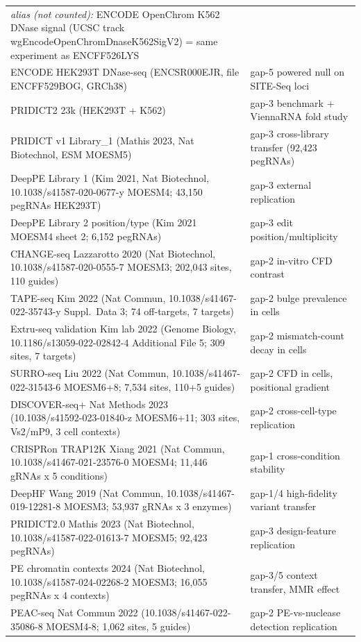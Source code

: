 \begin{longtable}{@{}p{}p{}@{}}
\quad \emph{alias (not counted):} ENCODE OpenChrom K562 DNase signal (UCSC track wgEncodeOpenChromDnaseK562SigV2) = same experiment as ENCFF526LYS \\
ENCODE HEK293T DNase-seq (ENCSR000EJR, file ENCFF529BOG, GRCh38) & gap-5 powered null on SITE-Seq loci \\
PRIDICT2 23k (HEK293T + K562) & gap-3 benchmark + ViennaRNA fold study \\
PRIDICT v1 Library\_1 (Mathis 2023, Nat Biotechnol, ESM MOESM5) & gap-3 cross-library transfer (92,423 pegRNAs) \\
DeepPE Library 1 (Kim 2021, Nat Biotechnol, 10.1038/s41587-020-0677-y MOESM4; 43,150 pegRNAs HEK293T) & gap-3 external replication \\
DeepPE Library 2 position/type (Kim 2021 MOESM4 sheet 2; 6,152 pegRNAs) & gap-3 edit position/multiplicity \\
CHANGE-seq Lazzarotto 2020 (Nat Biotechnol, 10.1038/s41587-020-0555-7 MOESM3; 202,043 sites, 110 guides) & gap-2 in-vitro CFD contrast \\
TAPE-seq Kim 2022 (Nat Commun, 10.1038/s41467-022-35743-y Suppl.\ Data 3; 74 off-targets, 7 targets) & gap-2 bulge prevalence in cells \\
Extru-seq validation Kim lab 2022 (Genome Biology, 10.1186/s13059-022-02842-4 Additional File 5; 309 sites, 7 targets) & gap-2 mismatch-count decay in cells \\
SURRO-seq Liu 2022 (Nat Commun, 10.1038/s41467-022-31543-6 MOESM6+8; 7,534 sites, 110+5 guides) & gap-2 CFD in cells, positional gradient \\
DISCOVER-seq+ Nat Methods 2023 (10.1038/s41592-023-01840-z MOESM6+11; 303 sites, Vs2/mP9, 3 cell contexts) & gap-2 cross-cell-type replication \\
CRISPRon TRAP12K Xiang 2021 (Nat Commun, 10.1038/s41467-021-23576-0 MOESM4; 11,446 gRNAs x 5 conditions) & gap-1 cross-condition stability \\
DeepHF Wang 2019 (Nat Commun, 10.1038/s41467-019-12281-8 MOESM3; 53,937 gRNAs x 3 enzymes) & gap-1/4 high-fidelity variant transfer \\
PRIDICT2.0 Mathis 2023 (Nat Biotechnol, 10.1038/s41587-022-01613-7 MOESM5; 92,423 pegRNAs) & gap-3 design-feature replication \\
PE chromatin contexts 2024 (Nat Biotechnol, 10.1038/s41587-024-02268-2 MOESM3; 16,055 pegRNAs x 4 contexts) & gap-3/5 context transfer, MMR effect \\
PEAC-seq Nat Commun 2022 (10.1038/s41467-022-35086-8 MOESM4-8; 1,062 sites, 5 guides) & gap-2 PE-vs-nuclease detection replication \\

\end{longtable}

